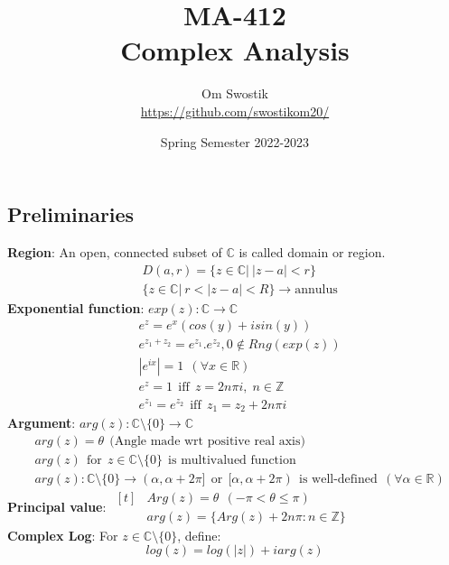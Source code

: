 \documentclass{article}
\title{\textbf{MA-412}\\ \textbf{Complex Analysis}}
\author{Om Swostik\\\url{https://github.com/swostikom20/}}
\date{Spring Semester 2022-2023}
\begin{document}
\maketitle
\clearpage
\begin{flushleft}
\section{Preliminaries}
\textbf{Region}: An open, connected subset of $\mathds{C}$ is called domain or region.
\begin{align}
&D(a,r)=\{z\in \mathds{C}|\: |z-a|<r\} \nonumber\\
&\{z\in \mathds{C}|\:r<|z-a|<R\}  \rightarrow \text{annulus} \nonumber
\end{align}
\textbf{Exponential function}: $exp(z):\mathds{C}\rightarrow\mathds{C}$
\begin{align}
&e^z=e^x(cos(y)+isin(y))\nonumber\\
&e^{z_1+z_2}=e^{z_1}.e^{z_2},  0\notin Rng(exp(z))\nonumber\\
&|e^{ix}|=1  \:\: (\forall x\in \mathds{R})\nonumber\\
&e^{z}=1 \:\:\text{iff} \:\: z=2n\pi i\text{,} \:\: n\in \mathds{Z}\nonumber\\
&e^{z_1}=e^{z_2} \:\:\text{iff}\:\: z_1=z_2+2n\pi i\nonumber
\end{align}
\textbf{Argument}: $arg(z):\mathds{C}\setminus \{0\}\rightarrow\mathds{C}$
\begin{align}
&arg(z)=\theta \:\:\text{(Angle made wrt positive real axis)} \nonumber\\
&arg(z) \:\:\text{for} \:\: z\in \mathds{C}\setminus \{0\} \:\:\text{is multivalued function} \nonumber\\
&arg(z): \mathds{C}\setminus \{0\}\rightarrow (\alpha,\alpha+2\pi] \:\:\text{or}\:\: [\alpha,\alpha+2\pi) \:\:\text{is well-defined}\:\: (\forall \alpha \in \mathds{R})\nonumber
\end{align} 
\textbf{Principal value}: 
$\begin{aligned}[t] 
&Arg(z)=\theta  \:\: (-\pi<\theta\leq \pi)\\ &arg(z)=\{Arg(z)+2n\pi:n\in \mathds{Z}\}
\end{aligned}$ \:\:
\\
\vspace{5mm}
\textbf{Complex Log}: For $z\in \mathds{C}\setminus \{0\}$, define: \begin{equation} log(z)=log(|z|)+ iarg(z) \nonumber \end{equation} 

\end{flushleft}
\end{document}
